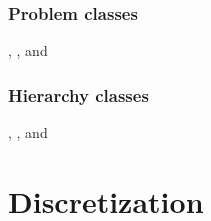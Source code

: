 \documentclass[10pt]{article}
\begin{document}
\subsubsection{Problem classes}

, , and 

\subsubsection{Hierarchy classes}

, , and 

\newpage
\section{Discretization} \label{s:discretization}

\newcommand{\indvar}{r}
 \newcommand{\uc}{u(\indvar)}
 \newcommand{\uv}{u(\volel)}
 \newcommand{\us}{u(\surfel)}

 \newcommand{\uxp}{u(\indvar+h_x)}
 \newcommand{\uxm}{u(\indvar-h_x)}
 \newcommand{\uxph}{u(\indvar+\frac{h_x}{2})}
 \newcommand{\uxmh}{u(\indvar-\frac{h_x}{2})}

 \newcommand{\uyp}{u(\indvar+h_y)}
 \newcommand{\uym}{u(\indvar-h_y)}
 \newcommand{\uyph}{u(\indvar+\frac{h_y}{2})}
 \newcommand{\uymh}{u(\indvar-\frac{h_y}{2})}

 \newcommand{\uzp}{u(\indvar+h_z)}
 \newcommand{\uzm}{u(\indvar-h_z)}
 \newcommand{\uzph}{u(\indvar+\frac{h_z}{2})}
 \newcommand{\uzmh}{u(\indvar-\frac{h_z}{2})}

 \newcommand{\norm}{\textbf{n}}

 \newcommand{\ac}{a(\indvar)}
 \newcommand{\av}{a(\volel)}
 \newcommand{\as}{a(\surfel)}

 \newcommand{\fc}{f(\indvar)}
 \newcommand{\fv}{f(\volel)}
 \newcommand{\fs}{f(\surfel)}

 \newcommand{\axph}{a(\indvar+h_x/2)}
 \newcommand{\axmh}{a(\indvar-h_x/2)}
 \newcommand{\ayph}{a(\indvar+h_y/2)}
 \newcommand{\aymh}{a(\indvar-h_y/2)}
 \newcommand{\azph}{a(\indvar+h_z/2)}
 \newcommand{\azmh}{a(\indvar-h_z/2)}

 \newcommand{\axpH}{a(\indvar+H_x/2)}
\end{document}
